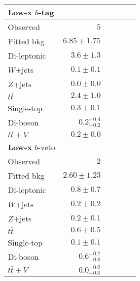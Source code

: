 \documentclass{article}
\begin{document}
\begin{tabular*}{\textwidth}{@{\extracolsep{\fill}}lrrrrr}
\toprule
\textbf{Low-x} $b$-tag &  \\
\midrule

Observed          & $5$                    \\
\midrule
Fitted bkg         & $6.85 \pm 1.75$              \\
\midrule
        Di-leptonic         & $3.6 \pm 1.3$              \\
        $W$+jets         & $0.1 \pm 0.1$              \\
        $Z$+jets         & $0.0 \pm 0.0$              \\
        $t\bar{t}$         & $2.4 \pm 1.0$              \\
        Single-top         & $0.3 \pm 0.1$              \\
        Di-boson         & $0.2_{-0.2}^{+0.4}$              \\
        $t\bar{t}+V$         & $0.2 \pm 0.0$              \\
\toprule
\textbf{Low-x} $b$-veto &  \\
\midrule
Observed          & $2$                    \\
\midrule
Fitted bkg         & $2.60 \pm 1.23$              \\
\midrule
        Di-leptonic         & $0.8 \pm 0.7$              \\
        $W$+jets         & $0.2 \pm 0.2$              \\
        $Z$+jets         & $0.2 \pm 0.1$              \\
        $t\bar{t}$         & $0.6 \pm 0.5$              \\
        Single-top         & $0.1 \pm 0.1$              \\
        Di-boson         & $0.6_{-0.6}^{+0.7}$              \\
        $t\bar{t}+V$         & $0.0_{-0.0}^{+0.0}$              \\


\bottomrule
\end{tabular*}
\end{document}
